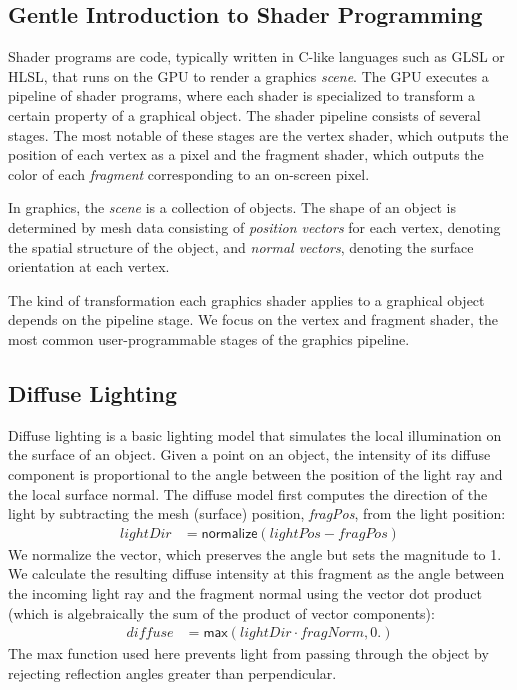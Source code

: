 \subsection{Gentle Introduction to Shader Programming}
Shader programs are code, typically written in C-like languages such as GLSL or HLSL, that runs on the GPU to render a graphics \emph{scene}. The GPU executes a pipeline of shader programs, where each shader is specialized to transform a certain property of a graphical object.  The shader pipeline consists of several stages.  The most notable of these stages are the vertex shader, which outputs the position of each vertex as a pixel and the fragment shader, which outputs the color of each \emph{fragment} corresponding to an on-screen pixel.

In graphics, the \emph{scene} is a collection of objects. The shape of an object is determined by mesh data consisting of \emph{position vectors} for each vertex, denoting the spatial structure of the object, and \emph{normal vectors}, denoting the surface orientation at each vertex. 

The kind of transformation each graphics shader applies to a graphical object depends on the pipeline stage. 
We focus on the vertex and fragment shader, the most common user-programmable stages of the graphics pipeline. 

\subsection{Diffuse Lighting} 

Diffuse lighting is a basic lighting model that simulates the local illumination on the surface of an object.
Given a point on an object, the intensity of its diffuse component is proportional to the angle between the position of the light ray and the local surface normal. 
The diffuse model first computes the direction of the light by subtracting the mesh (surface) position, \textit{fragPos}, from the light position:
%
\begin{align*}
\mathit{lightDir} &= \mathsf{normalize}(\mathit{lightPos} - \mathit{fragPos})
\end{align*}
%
We normalize the vector, which preserves the angle but sets the magnitude to 1. 
We calculate the resulting diffuse intensity at this fragment as the angle between the incoming light ray and the fragment normal using the vector dot product (which is algebraically the sum of the product of vector components):
%
\begin{align*}
\mathit{diffuse} &= \mathsf{max}(\mathit{lightDir}\cdot\mathit{fragNorm}, 0.)
\end{align*}
%
The \textsf{max} function used here prevents light from passing through the object by rejecting reflection angles greater than perpendicular.

